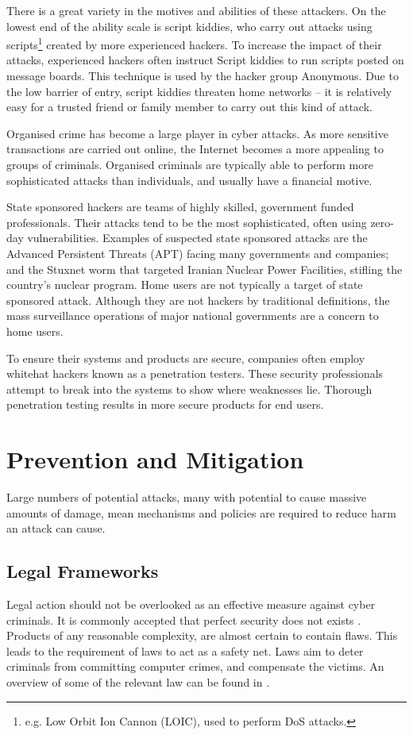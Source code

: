 \documentclass[10pt,journal,compsoc]{IEEEtran}
\begin{document}
There is a great variety in the motives and abilities of these attackers. On
the lowest end of the ability scale is script kiddies, who carry out attacks
using scripts\footnote{e.g. Low Orbit Ion Cannon (LOIC), used to perform DoS
attacks.} created by more experienced hackers. To increase the impact of their
attacks, experienced hackers often instruct Script kiddies to run scripts
posted on message boards. This technique is used by the hacker group Anonymous.
Due to the low barrier of entry, script kiddies threaten home networks -- it is
relatively easy for a trusted friend or family member to carry out this kind of
attack. 

Organised crime has become a large player in cyber attacks. As more sensitive
transactions are carried out online, the Internet becomes a more appealing to
groups of criminals. Organised criminals are typically able to perform more
sophisticated attacks than individuals, and usually have a financial motive. 

State sponsored hackers are teams of highly skilled, government funded
professionals. Their attacks tend to be the most sophisticated, often using
zero-day vulnerabilities.  Examples of suspected state sponsored attacks are
the Advanced Persistent Threats (APT) facing many governments and companies;
and the Stuxnet worm that targeted Iranian Nuclear Power Facilities, stifling
the country's nuclear program. Home users are not typically a target of state
sponsored attack. Although they are not hackers by traditional definitions, the
mass surveillance operations of major national governments are a concern to
home users.  

To ensure their systems and products are secure, companies often employ
whitehat hackers known as a penetration testers. These security professionals
attempt to break into the systems to show where weaknesses lie. Thorough
penetration testing results in more secure products for end users.

\section{Prevention and Mitigation}
Large numbers of potential attacks, many with potential to cause massive
amounts of damage, mean mechanisms and policies are required to reduce harm an
attack can cause. 

\subsection{Legal Frameworks}
Legal action should not be overlooked as an effective measure against cyber
criminals. It is commonly accepted that perfect security does not exists
\cite{ThereMustBeA}. Products of any reasonable complexity, are almost certain
to contain flaws. This leads to the requirement of laws to act as a safety net.
Laws aim to deter criminals from committing computer crimes, and compensate the
victims. An overview of some of the relevant law can be found in
\cite{Weber2010}. 
\end{document}

